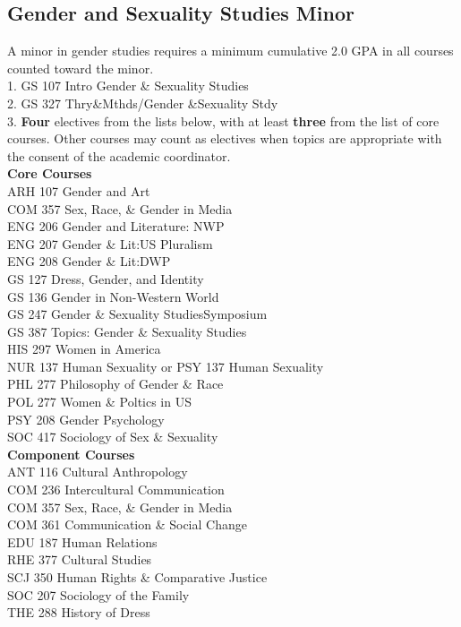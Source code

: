 \documentclass[
  letterpaper,
]{scrbook}
\begin{document}
\subsection{Gender and Sexuality Studies
Minor}\label{gender-and-sexuality-studies-minor}

A minor in gender studies requires a minimum cumulative 2.0 GPA in all
courses counted toward the minor.\\
1. GS 107 Intro Gender \& Sexuality Studies\\
2. GS 327 Thry\&Mthds/Gender \&Sexuality Stdy\\
3. \textbf{Four} electives from the lists below, with at least
\textbf{three} from the list of core courses. Other courses may count as
electives when topics are appropriate with the consent of the academic
coordinator.\\
\textbf{Core Courses}\\
ARH 107 Gender and Art\\
COM 357 Sex, Race, \& Gender in Media\\
ENG 206 Gender and Literature: NWP\\
ENG 207 Gender \& Lit:US Pluralism\\
ENG 208 Gender \& Lit:DWP\\
GS 127 Dress, Gender, and Identity\\
GS 136 Gender in Non-Western World\\
GS 247 Gender \& Sexuality StudiesSymposium\\
GS 387 Topics: Gender \& Sexuality Studies\\
HIS 297 Women in America\\
NUR 137 Human Sexuality or PSY 137 Human Sexuality\\
PHL 277 Philosophy of Gender \& Race\\
POL 277 Women \& Poltics in US\\
PSY 208 Gender Psychology\\
SOC 417 Sociology of Sex \& Sexuality\\
\textbf{Component Courses}\\
ANT 116 Cultural Anthropology\\
COM 236 Intercultural Communication\\
COM 357 Sex, Race, \& Gender in Media\\
COM 361 Communication \& Social Change\\
EDU 187 Human Relations\\
RHE 377 Cultural Studies\\
SCJ 350 Human Rights \& Comparative Justice\\
SOC 207 Sociology of the Family\\
THE 288 History of Dress
\end{document}

